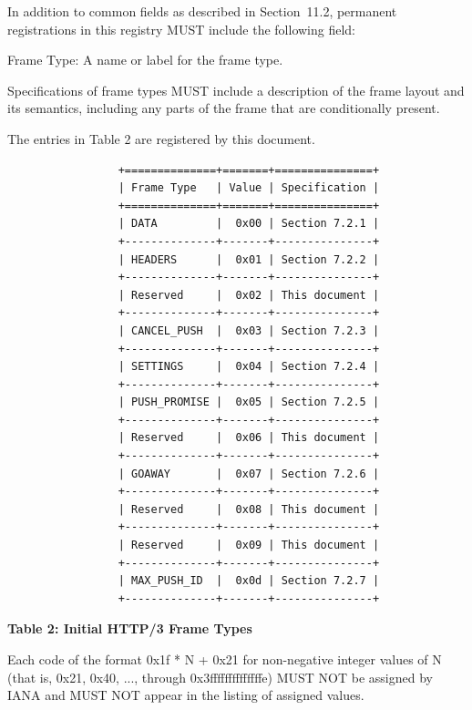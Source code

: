 \documentclass{article}
\begin{document}
In addition to common fields as described in Section~11.2, permanent registrations in this registry MUST include the following field:

Frame Type:  A name or label for the frame type.

Specifications of frame types MUST include a description of the frame layout and its semantics, including any parts of the frame that are conditionally present.

The entries in Table 2 are registered by this document.

\begin{verbatim}
                 +==============+=======+===============+
                 | Frame Type   | Value | Specification |
                 +==============+=======+===============+
                 | DATA         |  0x00 | Section 7.2.1 |
                 +--------------+-------+---------------+
                 | HEADERS      |  0x01 | Section 7.2.2 |
                 +--------------+-------+---------------+
                 | Reserved     |  0x02 | This document |
                 +--------------+-------+---------------+
                 | CANCEL_PUSH  |  0x03 | Section 7.2.3 |
                 +--------------+-------+---------------+
                 | SETTINGS     |  0x04 | Section 7.2.4 |
                 +--------------+-------+---------------+
                 | PUSH_PROMISE |  0x05 | Section 7.2.5 |
                 +--------------+-------+---------------+
                 | Reserved     |  0x06 | This document |
                 +--------------+-------+---------------+
                 | GOAWAY       |  0x07 | Section 7.2.6 |
                 +--------------+-------+---------------+
                 | Reserved     |  0x08 | This document |
                 +--------------+-------+---------------+
                 | Reserved     |  0x09 | This document |
                 +--------------+-------+---------------+
                 | MAX_PUSH_ID  |  0x0d | Section 7.2.7 |
                 +--------------+-------+---------------+
\end{verbatim}

\begin{center}
\textbf{Table 2: Initial HTTP/3 Frame Types}
\end{center}

Each code of the format 0x1f * N + 0x21 for non-negative integer values of N (that is, 0x21, 0x40, ..., through 0x3ffffffffffffffe) MUST NOT be assigned by IANA and MUST NOT appear in the listing of assigned values.
\end{document}
